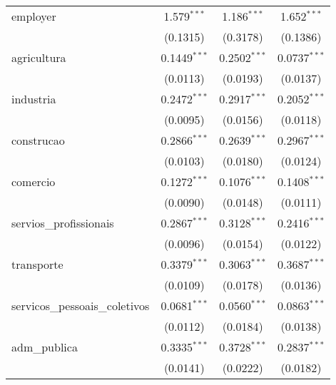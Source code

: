 \begin{tabular}{lccc}
   employer                        & 1.579$^{***}$           & 1.186$^{***}$           & 1.652$^{***}$\\   
                                   & (0.1315)                & (0.3178)                & (0.1386)\\   
   agricultura                     & 0.1449$^{***}$          & 0.2502$^{***}$          & 0.0737$^{***}$\\   
                                   & (0.0113)                & (0.0193)                & (0.0137)\\   
   industria                       & 0.2472$^{***}$          & 0.2917$^{***}$          & 0.2052$^{***}$\\   
                                   & (0.0095)                & (0.0156)                & (0.0118)\\   
   construcao                      & 0.2866$^{***}$          & 0.2639$^{***}$          & 0.2967$^{***}$\\   
                                   & (0.0103)                & (0.0180)                & (0.0124)\\   
   comercio                        & 0.1272$^{***}$          & 0.1076$^{***}$          & 0.1408$^{***}$\\   
                                   & (0.0090)                & (0.0148)                & (0.0111)\\   
   servios\_profissionais          & 0.2867$^{***}$          & 0.3128$^{***}$          & 0.2416$^{***}$\\   
                                   & (0.0096)                & (0.0154)                & (0.0122)\\   
   transporte                      & 0.3379$^{***}$          & 0.3063$^{***}$          & 0.3687$^{***}$\\   
                                   & (0.0109)                & (0.0178)                & (0.0136)\\   
   servicos\_pessoais\_coletivos   & 0.0681$^{***}$          & 0.0560$^{***}$          & 0.0863$^{***}$\\   
                                   & (0.0112)                & (0.0184)                & (0.0138)\\   
   adm\_publica                    & 0.3335$^{***}$          & 0.3728$^{***}$          & 0.2837$^{***}$\\   
                                   & (0.0141)                & (0.0222)                & (0.0182)\\   

\end{tabular}
